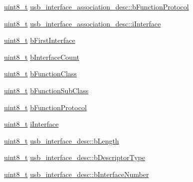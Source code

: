 \begin{DoxyCompactItemize}
\item 
\hyperlink{stdint_8h_aba7bc1797add20fe3efdf37ced1182c5}{uint8\-\_\-t} \hyperlink{group___p_i_o_s___u_s_b___d_e_f_s_gae62dbcef82dd75a085f93d53a9c3e515}{usb\-\_\-interface\-\_\-association\-\_\-desc\-::b\-Function\-Protocol}
\item 
\hyperlink{stdint_8h_aba7bc1797add20fe3efdf37ced1182c5}{uint8\-\_\-t} \hyperlink{group___p_i_o_s___u_s_b___d_e_f_s_gaa00aa6d432539190581b46990ad5cdf5}{usb\-\_\-interface\-\_\-association\-\_\-desc\-::i\-Interface}
\item 
\hyperlink{stdint_8h_aba7bc1797add20fe3efdf37ced1182c5}{uint8\-\_\-t} \hyperlink{group___p_i_o_s___u_s_b___d_e_f_s_ga85323ed61eb948bdea147d67e01ddc2d}{b\-First\-Interface}
\item 
\hyperlink{stdint_8h_aba7bc1797add20fe3efdf37ced1182c5}{uint8\-\_\-t} \hyperlink{group___p_i_o_s___u_s_b___d_e_f_s_ga9674bda677f9898106ec2b6fe5f5723d}{b\-Interface\-Count}
\item 
\hyperlink{stdint_8h_aba7bc1797add20fe3efdf37ced1182c5}{uint8\-\_\-t} \hyperlink{group___p_i_o_s___u_s_b___d_e_f_s_ga1ed25bc3320ca90e4d3acb4410aea704}{b\-Function\-Class}
\item 
\hyperlink{stdint_8h_aba7bc1797add20fe3efdf37ced1182c5}{uint8\-\_\-t} \hyperlink{group___p_i_o_s___u_s_b___d_e_f_s_gab25f749c091ce99b6868c949c4e45bc3}{b\-Function\-Sub\-Class}
\item 
\hyperlink{stdint_8h_aba7bc1797add20fe3efdf37ced1182c5}{uint8\-\_\-t} \hyperlink{group___p_i_o_s___u_s_b___d_e_f_s_ga2b3b905ab34e6e28b57c3ddc51b3487c}{b\-Function\-Protocol}
\item 
\hyperlink{stdint_8h_aba7bc1797add20fe3efdf37ced1182c5}{uint8\-\_\-t} \hyperlink{group___p_i_o_s___u_s_b___d_e_f_s_ga2e4535908d90f195c6347a91e15b544d}{i\-Interface}
\item 
\hyperlink{stdint_8h_aba7bc1797add20fe3efdf37ced1182c5}{uint8\-\_\-t} \hyperlink{group___p_i_o_s___u_s_b___d_e_f_s_gaa4b60d12645813f528deae9301fe2103}{usb\-\_\-interface\-\_\-desc\-::b\-Length}
\item 
\hyperlink{stdint_8h_aba7bc1797add20fe3efdf37ced1182c5}{uint8\-\_\-t} \hyperlink{group___p_i_o_s___u_s_b___d_e_f_s_ga324795326b03fff1d5c298b8dde76dc9}{usb\-\_\-interface\-\_\-desc\-::b\-Descriptor\-Type}
\item 
\hyperlink{stdint_8h_aba7bc1797add20fe3efdf37ced1182c5}{uint8\-\_\-t} \hyperlink{group___p_i_o_s___u_s_b___d_e_f_s_ga18e33c3c1b7bf4ea4cff62e4d603afd9}{usb\-\_\-interface\-\_\-desc\-::b\-Interface\-Number}
\item 

\end{DoxyCompactItemize}
